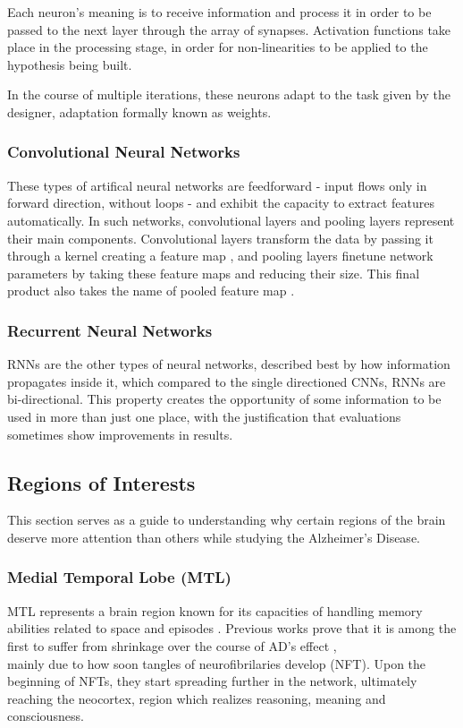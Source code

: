 \documentclass[a4paper, 12pt]{article}
\begin{document}
Each neuron's meaning is to receive information and process it in order to be passed to the next layer through the
array of synapses. Activation functions take place in the processing stage, in order for non-linearities to be applied
to the hypothesis being built.

In the course of multiple iterations, these neurons adapt to the task given by the designer, adaptation formally known as weights.

\subsubsection*{Convolutional Neural Networks}
These types of artifical neural networks are feedforward - input flows only in forward direction, without loops - and exhibit
the capacity to extract features automatically. In such networks, convolutional layers and pooling layers represent
their main components. Convolutional layers transform the data by passing it through a kernel creating a feature map
, and pooling layers finetune network parameters by taking these feature maps and reducing their size.
This final product also takes the name of pooled feature map \cite{li2021survey}.

\subsubsection*{Recurrent Neural Networks}
RNNs are the other types of neural networks, described best by how information propagates inside it, which compared to
the single directioned CNNs, RNNs are bi-directional. This property creates the opportunity of some information to be
used in more than just one place, with the justification that evaluations sometimes show improvements in results.


\subsection{Regions of Interests}
This section serves as a guide to understanding why certain regions of the brain deserve more attention than others while
studying the Alzheimer's Disease.

\subsubsection*{Medial Temporal Lobe (MTL)}
MTL represents a brain region known for its capacities of handling memory abilities related to space and episodes \cite{10.3389/fnsys.2017.00019}.
Previous works prove that it is among the first to suffer from shrinkage over the course of AD's effect \cite{deFlores2131}, \\
mainly due to how soon tangles of neurofibrilaries develop (NFT). Upon the beginning of NFTs, they start spreading further in the network,
ultimately reaching the neocortex, region which realizes reasoning, meaning and consciousness.
\end{document}
